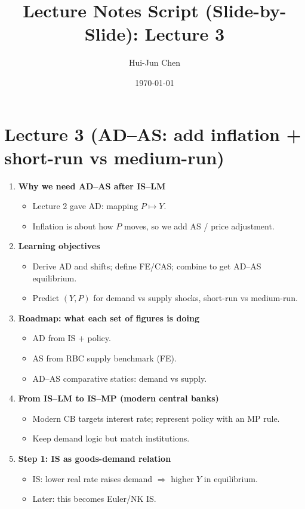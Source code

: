 \documentclass[11pt]{article}
\title{Lecture Notes Script (Slide-by-Slide): Lecture 3}
\author{Hui-Jun Chen}
\date{\today}
\begin{document}
\maketitle

\section*{Lecture 3 (AD--AS: add inflation + short-run vs medium-run)}

\begin{enumerate}
\item \textbf{Why we need AD--AS after IS--LM}
\begin{itemize}
\item Lecture 2 gave AD: mapping $P\mapsto Y$.
\item Inflation is about how $P$ moves, so we add AS / price adjustment.
\end{itemize}

\item \textbf{Learning objectives}
\begin{itemize}
\item Derive AD and shifts; define FE/CAS; combine to get AD--AS equilibrium.
\item Predict $(Y,P)$ for demand vs supply shocks, short-run vs medium-run.
\end{itemize}

\item \textbf{Roadmap: what each set of figures is doing}
\begin{itemize}
\item AD from IS + policy.
\item AS from RBC supply benchmark (FE).
\item AD--AS comparative statics: demand vs supply.
\end{itemize}

\item \textbf{From IS--LM to IS--MP (modern central banks)}
\begin{itemize}
\item Modern CB targets interest rate; represent policy with an MP rule.
\item Keep demand logic but match institutions.
\end{itemize}

\item \textbf{Step 1: IS as goods-demand relation}
\begin{itemize}
\item IS: lower real rate raises demand $\Rightarrow$ higher $Y$ in equilibrium.
\item Later: this becomes Euler/NK IS.
\end{itemize}


\end{enumerate}
\end{document}
